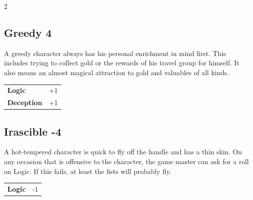 \begin{multicols}{2}
\begin{tcolorbox}
\vspace{3mm}



\end{tcolorbox}

\begin{tcolorbox}
    \subsection*{Greedy \hfill \small{4 }}
    \tcblower
A greedy character always has his personal enrichment in mind first. This includes trying to collect gold or the rewards of his travel group for himself. It also means an almost magical attraction to gold and valuables of all kinds.


\vspace{3mm}

\begin{tabular}{@{}ll@{}}
    \textbf{Logic} & +1\\
    \textbf{Deception} & +1\\
\end{tabular}


\end{tcolorbox}

\begin{tcolorbox}
    \subsection*{Irascible \hfill \small{-4 }}
    \tcblower
A hot-tempered character is quick to fly off the handle and has a thin skin. On any occasion that is offensive to the character, the game master can ask for a roll on Logic. If this fails, at least the fists will probably fly.


\vspace{3mm}

\begin{tabular}{@{}ll@{}}
    \textbf{Logic} & -1\\
\end{tabular}



\end{tcolorbox}
\end{multicols}
